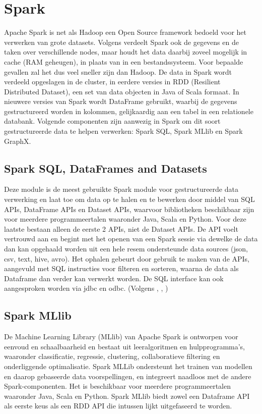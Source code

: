 \section{Spark}
Apache Spark is net als Hadoop een Open Source framework bedoeld voor het verwerken van grote datasets. Volgens \textcite{AwsAmazon2023a} verdeelt Spark ook de gegevens en de taken over verschillende nodes, maar houdt het data daarbij zoveel mogelijk in cache (RAM geheugen), in plaats van in een bestandssysteem. Voor bepaalde gevallen zal het dus veel sneller zijn dan Hadoop.
\newline
\newline
De data in Spark wordt verdeeld opgeslagen in de cluster, in eerdere versies in RDD (Resilient Distributed Dataset), een set van data objecten in Java of Scala formaat. In nieuwere versies van Spark wordt DataFrame gebruikt, waarbij de gegevens gestructureerd worden in kolommen, gelijkaardig aan een tabel in een relationele databank. Volgende componenten zijn aanwezig in Spark om dit soort gestructureerde data te helpen verwerken: Spark SQL, Spark MLlib en Spark GraphX.
\autocite{DataFlair2023}
\newline
\newline

\subsection{Spark SQL, DataFrames and Datasets}
Deze module is de meest gebruikte Spark module voor gestructureerde data verwerking en laat toe om data op te halen en te bewerken door middel van SQL APIs, DataFrame APIs en Dataset APIs, waarvoor bibliotheken beschikbaar zijn voor meerdere programmeertalen waaronder Java, Scala en Python. Voor deze laatste bestaan alleen de eerste 2 APIs, niet de Dataset APIs.
De API voelt vertrouwd aan en begint met het openen van een Spark sessie via dewelke de data dan kan opgehaald worden uit een hele resem ondersteunde data sources (json, csv, text, hive, avro). Het ophalen gebeurt door gebruik te maken van de APIs, aangevuld met SQL instructies voor filteren en sorteren, waarna de data als Dataframe dan verder kan verwerkt worden.
De SQL interface kan ook aangesproken worden via jdbc en odbc.
(Volgens \textcite{Spark2023}, \textcite{Naveen2023}, \textcite{Spark2023a})

\subsection{Spark MLlib}
De Machine Learning Library (MLlib) van Apache Spark is ontworpen voor eenvoud en schaalbaarheid  en bestaat uit leeralgoritmen en hulpprogramma's, waaronder classificatie, regressie, clustering, collaboratieve filtering en onderliggende optimalisatie. Spark MLLib ondersteunt het trainen van modellen en daarop gebaseerde data voorspellingen, en integreert naadloos met de andere Spark-componenten. Het is beschikbaar voor meerdere programmeertalen waaronder Java, Scala en Python.
Spark MLlib biedt zowel een Dataframe API als eerste keus als een RDD API die intussen lijkt uitgefaseerd te worden.
\autocite{Spark2023b}

